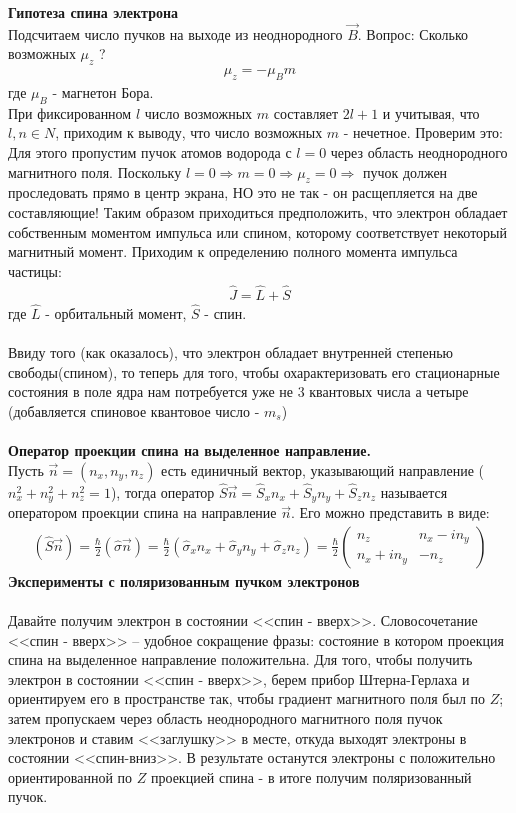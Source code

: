 \documentclass[__main__.tex]{subfiles}
\begin{document}
	\textbf{Гипотеза спина электрона}\\
	Подсчитаем число пучков на выходе из неоднородного $\vec{B}$. Вопрос: Сколько возможных $\mu_z$ ?
	\begin{gather*}
		\mu_z = -\mu_Bm
	\end{gather*}
	где $\mu_B$ - магнетон Бора.\\
	При фиксированном $l$ число возможных $m$ составляет $2l+1$ и учитывая, что $l,n \in N$, приходим к выводу, что число возможных $m$ - нечетное. Проверим это:\\
	Для этого пропустим пучок атомов водорода с $l=0$ через область неоднородного магнитного поля. Поскольку $l = 0 \Rightarrow m = 0 \Rightarrow \mu_z = 0 \Rightarrow$ пучок должен проследовать прямо в центр экрана, НО это не так - он расщепляется на две составляющие! Таким образом приходиться предположить, что электрон обладает собственным моментом импульса или спином, которому соответствует некоторый магнитный момент. Приходим к определению полного момента импульса частицы:
	\begin{gather*}
		\hat{J} = \hat{L}+\hat{S}
	\end{gather*} 
	где $\hat{L}$ - орбитальный момент, $\hat{S}$ - спин.\\\\
	Ввиду того (как оказалось), что электрон обладает внутренней степенью свободы(спином), то теперь для того, чтобы охарактеризовать его стационарные состояния в поле ядра нам потребуется уже не 3 квантовых числа а четыре (добавляется спиновое квантовое число - $m_s$)\\\\
	
	\textbf{Оператор проекции спина на выделенное направление.}\\
	Пусть $\vec{n} = (n_x,n_y,n_z)$ есть единичный вектор, указывающий направление ($n^2_x+n^2_y+n^2_z = 1$), тогда оператор $\hat{S}\vec{n} = \hat{S}_xn_x+\hat{S}_yn_y+\hat{S}_zn_z$ называется оператором проекции спина на направление $\vec{n}$. Его можно представить в виде:
	\begin{gather*}
		\left(\hat{S}\vec{n}\right) = \frac{\hbar}{2}\left(\hat{\sigma}\vec{n}\right)=\frac\hbar2\left(\hat{\sigma}_xn_x+\hat{\sigma}_yn_y+\hat{\sigma}_zn_z\right) = \frac{\hbar}{2}\begin{pmatrix}
			n_z & n_x-in_y\\
			n_x+in_y & -n_z
		\end{pmatrix}
	\end{gather*}
	\textbf{Эксперименты с поляризованным пучком электронов}\\\\
	Давайте получим электрон в состоянии <<спин - вверх>>. Словосочетание <<спин - вверх>> -- удобное сокращение фразы: состояние в котором проекция спина на выделенное направление положительна. Для того, чтобы  получить электрон в состоянии <<спин - вверх>>, берем прибор Штерна-Герлаха и ориентируем его в пространстве так, чтобы градиент магнитного поля был по $Z$; затем пропускаем через область неоднородного магнитного поля пучок электронов и ставим <<заглушку>> в месте, откуда выходят электроны в состоянии <<спин-вниз>>. В результате останутся электроны с положительно ориентированной по $Z$ проекцией спина - в итоге получим поляризованный пучок.  
\end{document}

